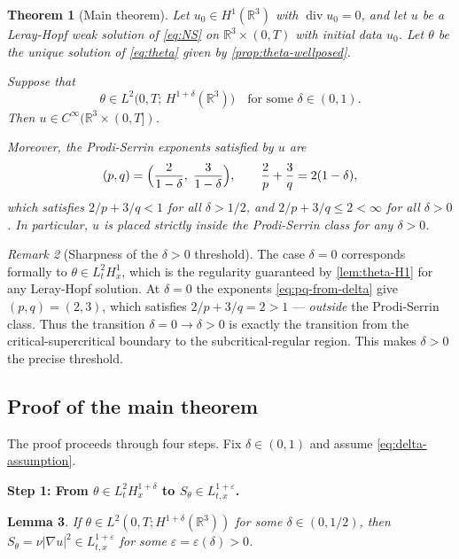\documentclass[12pt]{article}
\theoremstyle{plain}
\newtheorem{theorem}{Theorem}[section]
\newtheorem{lemma}[theorem]{Lemma}
\theoremstyle{definition}
\theoremstyle{remark}
\newtheorem{remark}[theorem]{Remark}
\newcommand{\R}{\mathbb{R}}
\newcommand{\abs}[1]{\left|#1\right|}
\newcommand{\eps}{\varepsilon}
\newcommand{\grad}{\nabla}
\newcommand{\Div}{\operatorname{div}}
\begin{document}
\begin{theorem}[Main theorem]\label{thm:main-precise}
  Let $u_0\in H^1(\R^3)$ with $\Div u_0=0$, and let $u$ be a Leray-Hopf
  weak solution of \eqref{eq:NS} on $\R^3\times(0,T)$ with initial data $u_0$.
  Let $\theta$ be the unique solution of \eqref{eq:theta} given by
  \cref{prop:theta-wellposed}.

  Suppose that
  \begin{equation}\label{eq:delta-assumption}
    \theta \in L^2\bigl(0,T;\,H^{1+\delta}(\R^3)\bigr)
    \quad\text{for some }\delta\in(0,1).
  \end{equation}
  Then $u\in C^\infty(\R^3\times(0,T])$.

  Moreover, the Prodi-Serrin exponents satisfied by $u$ are
  \begin{equation}\label{eq:pq-from-delta}
    (p,q) = \Bigl(\frac{2}{1-\delta},\;\frac{3}{1-\delta}\Bigr),
    \qquad
    \frac{2}{p}+\frac{3}{q} = 2(1-\delta),
  \end{equation}
  which satisfies $2/p+3/q<1$ for all $\delta>1/2$,
  and $2/p+3/q\leq 2<\infty$ for all $\delta>0$.
  In particular, $u$ is placed strictly inside the Prodi-Serrin class
  for any $\delta>0$.
\end{theorem}

\begin{remark}[Sharpness of the $\delta>0$ threshold]\label{rem:sharpness}
  The case $\delta=0$ corresponds formally to $\theta\in L^2_t H^1_x$,
  which is the regularity guaranteed by \cref{lem:theta-H1} for any
  Leray-Hopf solution.
  At $\delta=0$ the exponents \eqref{eq:pq-from-delta} give $(p,q)=(2,3)$,
  which satisfies $2/p+3/q=2>1$ — \emph{outside} the Prodi-Serrin class.
  Thus the transition $\delta=0\to\delta>0$ is exactly the transition from
  the critical-supercritical boundary to the subcritical-regular region.
  This makes $\delta>0$ the precise threshold.
\end{remark}

\subsection{Proof of the main theorem}

The proof proceeds through four steps.
Fix $\delta\in(0,1)$ and assume \eqref{eq:delta-assumption}.

\medskip
\noindent\textbf{Step 1: From $\theta\in L^2_t H^{1+\delta}_x$ to
$S_\theta\in L^{1+\eps}_{t,x}$.}

\begin{lemma}\label{lem:step1}
  If $\theta\in L^2(0,T;H^{1+\delta}(\R^3))$ for some $\delta\in(0,1/2)$,
  then $S_\theta = \nu\abs{\grad u}^2\in L^{1+\eps}_{t,x}$
  for some $\eps=\eps(\delta)>0$.
\end{lemma}
\end{document}
